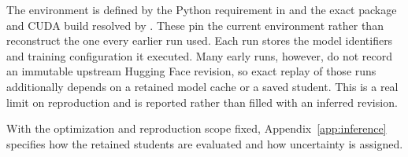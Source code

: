The environment is defined by the Python requirement in  and the exact package and CUDA build resolved by .
These pin the current environment rather than reconstruct the one every earlier run used.
Each run stores the model identifiers and training configuration it executed.
Many early runs, however, do not record an immutable upstream Hugging Face revision, so exact replay of those runs additionally depends on a retained model cache or a saved student.
This is a real limit on reproduction and is reported rather than filled with an inferred revision.

With the optimization and reproduction scope fixed, Appendix~\ref{app:inference} specifies how the retained students are evaluated and how uncertainty is assigned.
